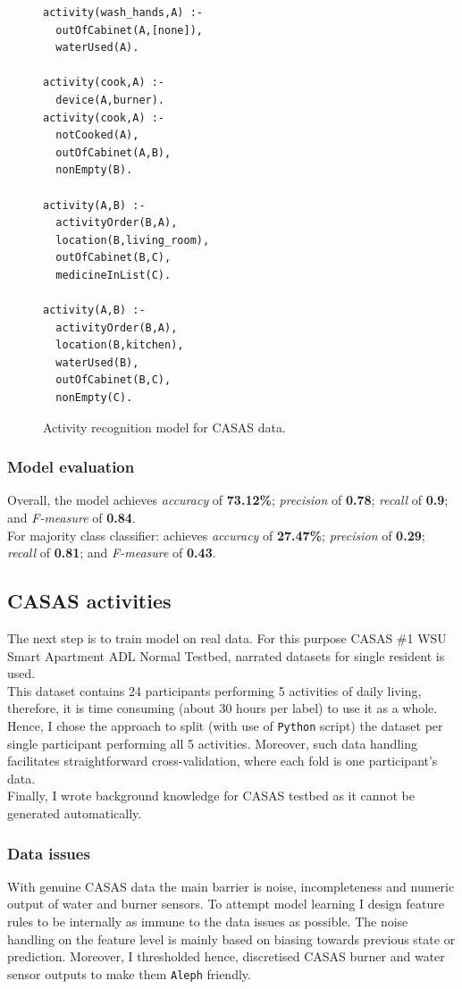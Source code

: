 \documentclass[10pt, a4paper, pdflatex, leqno, twoside, openright]{report}
\begin{document}
\begin{figure}[htb]
  \begin{verbatim}
activity(wash_hands,A) :-
  outOfCabinet(A,[none]),
  waterUsed(A).

activity(cook,A) :-
  device(A,burner).
activity(cook,A) :-
  notCooked(A),
  outOfCabinet(A,B),
  nonEmpty(B).

activity(A,B) :-
  activityOrder(B,A),
  location(B,living_room),
  outOfCabinet(B,C),
  medicineInList(C).

activity(A,B) :-
  activityOrder(B,A),
  location(B,kitchen),
  waterUsed(B),
  outOfCabinet(B,C),
  nonEmpty(C).
  \end{verbatim}
  \caption{Activity recognition model for CASAS data.\label{lst:CASASmodel}}
\end{figure}

      \subsubsection{Model evaluation}
Overall, the model achieves \emph{accuracy} of \textbf{73.12\%}; \emph{precision} of \textbf{0.78}; \emph{recall} of \textbf{0.9}; and \emph{F-measure} of \textbf{0.84}.\\

For majority class classifier: achieves \emph{accuracy} of \textbf{27.47\%}; \emph{precision} of \textbf{0.29}; \emph{recall} of \textbf{0.81}; and \emph{F-measure} of \textbf{0.43}.

    \subsection{CASAS activities}
The next step is to train model on real data. For this purpose CASAS \#1 WSU Smart Apartment ADL Normal Testbed, narrated datasets for single resident is used.\\
This dataset contains 24 participants performing 5 activities of daily living, therefore, it is time consuming (about 30 hours per label) to use it as a whole. Hence, I chose the approach to split (with use of \texttt{Python} script) the dataset per single participant performing all 5 activities. Moreover, such data handling facilitates straightforward cross-validation, where each fold is one participant's data.\\
Finally, I wrote background knowledge for CASAS testbed as it cannot be generated automatically.

      \subsubsection{Data issues}
With genuine CASAS data the main barrier is noise, incompleteness and numeric output of water and burner sensors. To attempt model learning I design feature rules to be internally as immune to the data issues as possible. The noise handling on the feature level is mainly based on biasing towards previous state or prediction. Moreover, I thresholded hence, discretised CASAS burner and water sensor outputs to make them \texttt{Aleph} friendly.
\end{document}
